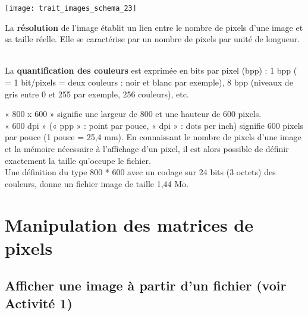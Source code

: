\begin{minipage}{4cm}
{\texttt{[image: trait\_images\_schema\_23]}}
\end{minipage}
\begin{minipage}{12cm}
 La \textbf{résolution} de l'image établit un lien entre le nombre de pixels d'une image et sa taille réelle. Elle se caractérise par un nombre de pixels par unité de longueur.
\end{minipage}

~~\\

La \textbf{quantification des couleurs} est exprimée en bits par pixel (bpp) :
1 bpp  ( = 1 bit/pixels = deux couleurs : noir et blanc par exemple), 8 bpp (niveaux de gris entre 0 et 255 par exemple,
256 couleurs), etc.

\begin{exemple}
« 800 x 600 » signifie une largeur de 800 et une hauteur de 600 pixels.\\
 « 600 dpi » (« ppp » : point par pouce, « dpi » : dots per inch) 
signifie 600 pixels par pouce (1 pouce = 25,4 mm).
En connaissant le nombre de pixels d'une image et la mémoire 
nécessaire à l'affichage d'un pixel, il est alors possible
de définir exactement la taille qu'occupe le fichier.\\
Une définition du type 800 * 600 avec un codage sur 24 bits 
(3 octets) des couleurs, donne un fichier image de taille
1,44 Mo.\\
\end{exemple}




% 
% 
% 
% 

\section{Manipulation des matrices de pixels}
\subsection{Afficher une image à partir d'un fichier  (voir  Activité 1)}

